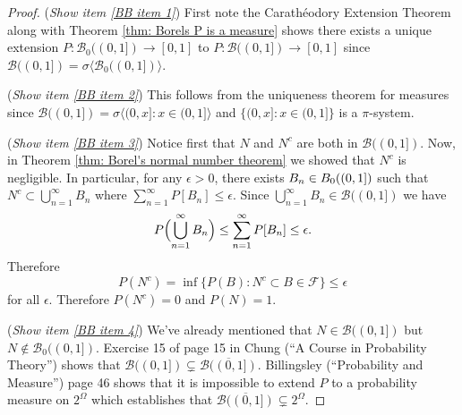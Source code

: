 \begin{proof}
({\sl Show item \ref{BB item 1}}) First note the Carath\'eodory Extension Theorem  along with Theorem \ref{thm: Borels P is a measure} shows there exists a unique extension $P:\mathcal B_0((0,1])\rightarrow [0,1]$ to $P:\mathcal B((0,1])\rightarrow [0,1]$ since $\mathcal B((0,1])=\sigma\bigl\langle \mathcal B_0((0,1]) \bigr\rangle$.

({\sl Show item \ref{BB item 2}}) This follows from the uniqueness theorem for measures since $\mathcal B((0,1]) = \sigma\langle  (0,x]\colon x\in (0,1]\rangle$ and $\{(0,x]\colon x\in (0,1] \}$ is a $\pi$-system.


({\sl Show item \ref{BB item 3}})
Notice first that $N$ and $N^c$ are both in $\mathcal B((0,1])$.
Now, in Theorem \ref{thm: Borel's normal number theorem} we showed that $N^c$ is negligible. In particular, for any $\epsilon >0$, there exists $B_n\in \mathcal \mathcal B_0((0,1])$ such that $N^c\subset \bigcup_{n=1}^\infty B_n$ where  $\sum_{n=1}^\infty P[B_n]\leq \epsilon$. Since  $\bigcup_{n=1}^\infty B_n\in \mathcal B((0,1]) $ we have
\[P\Bigl(\bigcup_{n=1}^\infty B_n\Bigr)\leq \sum_{n=1}^\infty P[B_n]\leq \epsilon. \]
Therefore
\[P(N^c)= \inf\{P(B)\colon N^c\subset B\in \mathcal F  \}\leq \epsilon  \]
for all $\epsilon$. Therefore $P(N^c)=0$ and $P(N)=1$.


({\sl Show item \ref{BB item 4}}) We've already mentioned that $N\in \mathcal B((0,1])$ but $N\notin \mathcal B_0((0,1])$. Exercise 15 of page 15 in Chung (``A Course in Probability Theory'') shows that $\mathcal B((0,1]) \subsetneq  \overline{\mathcal B((0,1])}$. Billingsley (``Probability and Measure'') page 46 shows that it is impossible to extend $P$ to a probability measure on $2^\Omega$ which establishes that $ \overline{\mathcal B((0,1])}\subsetneq 2^\Omega$.

\end{proof}





